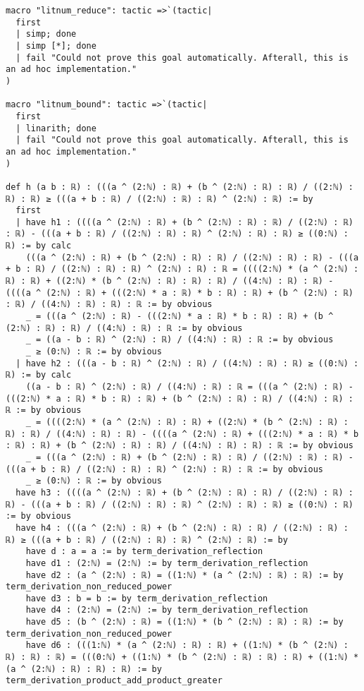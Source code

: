 \documentclass{article}
\begin{document}
\begin{tcolorbox}[colback=white!10, width=\linewidth]
\begin{lstlisting}[language=Lean4]
macro "litnum_reduce": tactic =>`(tactic|
  first
  | simp; done
  | simp [*]; done
  | fail "Could not prove this goal automatically. Afterall, this is an ad hoc implementation."
)

macro "litnum_bound": tactic =>`(tactic|
  first
  | linarith; done
  | fail "Could not prove this goal automatically. Afterall, this is an ad hoc implementation."
)

def h (a b : ℝ) : (((a ^ (2:ℕ) : ℝ) + (b ^ (2:ℕ) : ℝ) : ℝ) / ((2:ℕ) : ℝ) : ℝ) ≥ (((a + b : ℝ) / ((2:ℕ) : ℝ) : ℝ) ^ (2:ℕ) : ℝ) := by
  first
  | have h1 : ((((a ^ (2:ℕ) : ℝ) + (b ^ (2:ℕ) : ℝ) : ℝ) / ((2:ℕ) : ℝ) : ℝ) - (((a + b : ℝ) / ((2:ℕ) : ℝ) : ℝ) ^ (2:ℕ) : ℝ) : ℝ) ≥ ((0:ℕ) : ℝ) := by calc
    (((a ^ (2:ℕ) : ℝ) + (b ^ (2:ℕ) : ℝ) : ℝ) / ((2:ℕ) : ℝ) : ℝ) - (((a + b : ℝ) / ((2:ℕ) : ℝ) : ℝ) ^ (2:ℕ) : ℝ) : ℝ = ((((2:ℕ) * (a ^ (2:ℕ) : ℝ) : ℝ) + ((2:ℕ) * (b ^ (2:ℕ) : ℝ) : ℝ) : ℝ) / ((4:ℕ) : ℝ) : ℝ) - ((((a ^ (2:ℕ) : ℝ) + (((2:ℕ) * a : ℝ) * b : ℝ) : ℝ) + (b ^ (2:ℕ) : ℝ) : ℝ) / ((4:ℕ) : ℝ) : ℝ) : ℝ := by obvious
    _ = (((a ^ (2:ℕ) : ℝ) - (((2:ℕ) * a : ℝ) * b : ℝ) : ℝ) + (b ^ (2:ℕ) : ℝ) : ℝ) / ((4:ℕ) : ℝ) : ℝ := by obvious
    _ = ((a - b : ℝ) ^ (2:ℕ) : ℝ) / ((4:ℕ) : ℝ) : ℝ := by obvious
    _ ≥ (0:ℕ) : ℝ := by obvious
  | have h2 : (((a - b : ℝ) ^ (2:ℕ) : ℝ) / ((4:ℕ) : ℝ) : ℝ) ≥ ((0:ℕ) : ℝ) := by calc
    ((a - b : ℝ) ^ (2:ℕ) : ℝ) / ((4:ℕ) : ℝ) : ℝ = (((a ^ (2:ℕ) : ℝ) - (((2:ℕ) * a : ℝ) * b : ℝ) : ℝ) + (b ^ (2:ℕ) : ℝ) : ℝ) / ((4:ℕ) : ℝ) : ℝ := by obvious
    _ = ((((2:ℕ) * (a ^ (2:ℕ) : ℝ) : ℝ) + ((2:ℕ) * (b ^ (2:ℕ) : ℝ) : ℝ) : ℝ) / ((4:ℕ) : ℝ) : ℝ) - ((((a ^ (2:ℕ) : ℝ) + (((2:ℕ) * a : ℝ) * b : ℝ) : ℝ) + (b ^ (2:ℕ) : ℝ) : ℝ) / ((4:ℕ) : ℝ) : ℝ) : ℝ := by obvious
    _ = (((a ^ (2:ℕ) : ℝ) + (b ^ (2:ℕ) : ℝ) : ℝ) / ((2:ℕ) : ℝ) : ℝ) - (((a + b : ℝ) / ((2:ℕ) : ℝ) : ℝ) ^ (2:ℕ) : ℝ) : ℝ := by obvious
    _ ≥ (0:ℕ) : ℝ := by obvious
  have h3 : ((((a ^ (2:ℕ) : ℝ) + (b ^ (2:ℕ) : ℝ) : ℝ) / ((2:ℕ) : ℝ) : ℝ) - (((a + b : ℝ) / ((2:ℕ) : ℝ) : ℝ) ^ (2:ℕ) : ℝ) : ℝ) ≥ ((0:ℕ) : ℝ) := by obvious
  have h4 : (((a ^ (2:ℕ) : ℝ) + (b ^ (2:ℕ) : ℝ) : ℝ) / ((2:ℕ) : ℝ) : ℝ) ≥ (((a + b : ℝ) / ((2:ℕ) : ℝ) : ℝ) ^ (2:ℕ) : ℝ) := by
    have d : a = a := by term_derivation_reflection
    have d1 : (2:ℕ) = (2:ℕ) := by term_derivation_reflection
    have d2 : (a ^ (2:ℕ) : ℝ) = ((1:ℕ) * (a ^ (2:ℕ) : ℝ) : ℝ) := by term_derivation_non_reduced_power
    have d3 : b = b := by term_derivation_reflection
    have d4 : (2:ℕ) = (2:ℕ) := by term_derivation_reflection
    have d5 : (b ^ (2:ℕ) : ℝ) = ((1:ℕ) * (b ^ (2:ℕ) : ℝ) : ℝ) := by term_derivation_non_reduced_power
    have d6 : (((1:ℕ) * (a ^ (2:ℕ) : ℝ) : ℝ) + ((1:ℕ) * (b ^ (2:ℕ) : ℝ) : ℝ) : ℝ) = (((0:ℕ) + ((1:ℕ) * (b ^ (2:ℕ) : ℝ) : ℝ) : ℝ) + ((1:ℕ) * (a ^ (2:ℕ) : ℝ) : ℝ) : ℝ) := by term_derivation_product_add_product_greater

\end{lstlisting}
\end{tcolorbox}
\end{document}
